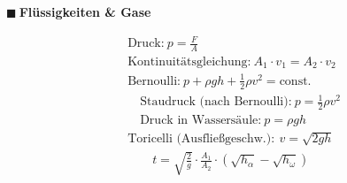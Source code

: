 \documentclass[a4paper,10pt]{article}
\renewcommand{\textbf}[1]{\textsf{{\bfseries {#1}}}}
\renewcommand{\plmtsquare}{{\color{miugray} $\blacksquare~$}}
\begin{document}
\begin{minipage}[t]{.55\textwidth}%

\raggedbottom

\plmtsquare \textbf{Flüssigkeiten \& Gase}\par \vspace*{-4mm}
\begin{align*}
&\text{Druck:} ~ p = \frac{F}{A} \\
&\text{Kontinuitätsgleichung:} ~ A_1 \cdot v_1 = A_2 \cdot v_2 \\
&\text{Bernoulli:} 		~ p + \rho g h + \frac{1}{2} \rho v^2 = \text{const.} \\[-4pt]
&\quad \text{Staudruck (nach Bernoulli):} ~ p = \frac{1}{2} \rho v^2 \\[-4pt]
&\quad \text{Druck in Wassersäule:} ~ p = \rho gh \\
&\text{Toricelli (Ausfließgeschw.)}: ~ v = \sqrt{2gh} \\[-2pt]
&\qquad t = \sqrt{\frac{2}{g}} \cdot \frac{A_1}{A_2} \cdot (\sqrt{h_{\alpha}}-\sqrt{h_{\omega}})
\end{align*}


\end{minipage}
\end{document}
